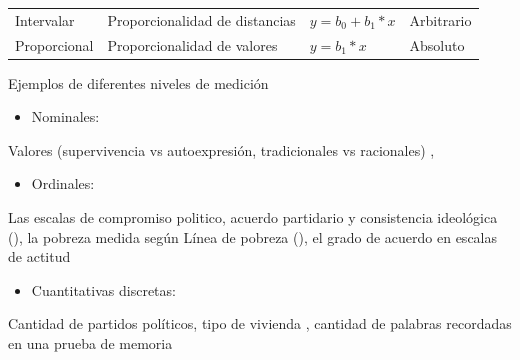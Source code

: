 \documentclass[]{book}
\providecommand{\tightlist}{%
  \setlength{\itemsep}{0pt}\setlength{\parskip}{0pt}}
\begin{document}
\begin{longtable}[]{@{}llll@{}}
\begin{minipage}[t]{0.14\columnwidth}
Intervalar\strut
\end{minipage} & \begin{minipage}[t]{0.29\columnwidth}\raggedright
Proporcionalidad de distancias\strut
\end{minipage} & \begin{minipage}[t]{0.32\columnwidth}\raggedright
\(y = b_0 + b_1*x\)\strut
\end{minipage} & \begin{minipage}[t]{0.14\columnwidth}\raggedright
Arbitrario\strut
\end{minipage}\tabularnewline
\begin{minipage}[t]{0.14\columnwidth}\raggedright
Proporcional\strut
\end{minipage} & \begin{minipage}[t]{0.29\columnwidth}\raggedright
Proporcionalidad de valores\strut
\end{minipage} & \begin{minipage}[t]{0.32\columnwidth}\raggedright
\(y = b_1*x\)\strut
\end{minipage} & \begin{minipage}[t]{0.14\columnwidth}\raggedright
Absoluto\strut
\end{minipage}\tabularnewline
\bottomrule
\end{longtable}

Ejemplos de diferentes niveles de medición

\begin{itemize}
\tightlist
\item
  Nominales:
\end{itemize}

Valores (supervivencia vs autoexpresión, tradicionales vs racionales) \citet{Inglehart2018}, \citet{Norris2011}

\begin{itemize}
\tightlist
\item
  Ordinales:
\end{itemize}

Las escalas de compromiso politico, acuerdo partidario y consistencia ideológica (\citet{Doherty2016}), la pobreza medida según Línea de pobreza (\citet{INDEC2016}), el grado de acuerdo en escalas de actitud \citet{Robinson2014}

\begin{itemize}
\tightlist
\item
  Cuantitativas discretas:
\end{itemize}

Cantidad de partidos políticos, tipo de vivienda \citet{INDEC2018}, cantidad de palabras recordadas en una prueba de memoria
\end{document}
